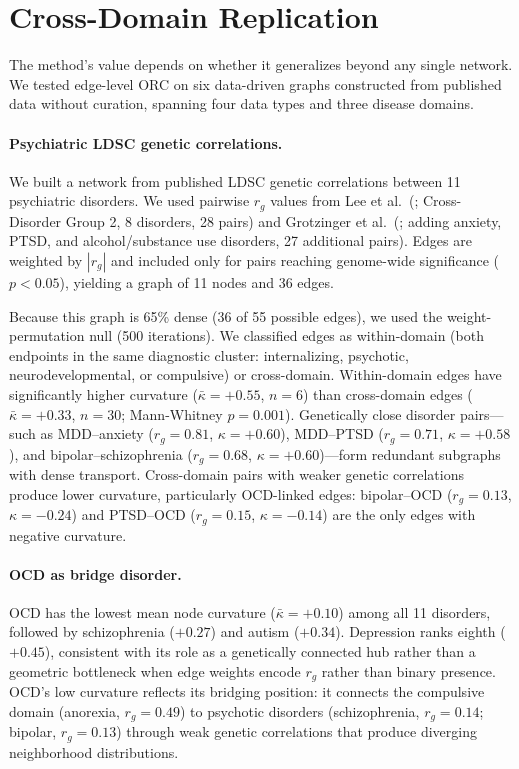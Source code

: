 \documentclass[11pt]{article}
\begin{document}
\section{Cross-Domain Replication}
\label{sec:replication}
\label{sec:ldsc}

The method's value depends on whether it generalizes beyond any single network. We tested edge-level ORC on six data-driven graphs constructed from published data without curation, spanning four data types and three disease domains.

\paragraph{Psychiatric LDSC genetic correlations.} We built a network from published LDSC genetic correlations \citep{buliksullivan2015ld} between 11 psychiatric disorders. We used pairwise $r_g$ values from Lee et al.\ (\citeyear{lee2022genetic}; Cross-Disorder Group 2, 8 disorders, 28 pairs) and Grotzinger et al.\ (\citeyear{grotzinger2022genetic}; adding anxiety, PTSD, and alcohol/substance use disorders, 27 additional pairs). Edges are weighted by $|r_g|$ and included only for pairs reaching genome-wide significance ($p < 0.05$), yielding a graph of 11 nodes and 36 edges.

Because this graph is 65\% dense (36 of 55 possible edges), we used the weight-permutation null (500 iterations). We classified edges as within-domain (both endpoints in the same diagnostic cluster: internalizing, psychotic, neurodevelopmental, or compulsive) or cross-domain. Within-domain edges have significantly higher curvature ($\bar{\kappa} = +0.55$, $n = 6$) than cross-domain edges ($\bar{\kappa} = +0.33$, $n = 30$; Mann-Whitney $p = 0.001$). Genetically close disorder pairs---such as MDD--anxiety ($r_g = 0.81$, $\kappa = +0.60$), MDD--PTSD ($r_g = 0.71$, $\kappa = +0.58$), and bipolar--schizophrenia ($r_g = 0.68$, $\kappa = +0.60$)---form redundant subgraphs with dense transport. Cross-domain pairs with weaker genetic correlations produce lower curvature, particularly OCD-linked edges: bipolar--OCD ($r_g = 0.13$, $\kappa = -0.24$) and PTSD--OCD ($r_g = 0.15$, $\kappa = -0.14$) are the only edges with negative curvature.

\paragraph{OCD as bridge disorder.} OCD has the lowest mean node curvature ($\bar{\kappa} = +0.10$) among all 11 disorders, followed by schizophrenia ($+0.27$) and autism ($+0.34$). Depression ranks eighth ($+0.45$), consistent with its role as a genetically connected hub rather than a geometric bottleneck when edge weights encode $r_g$ rather than binary presence. OCD's low curvature reflects its bridging position: it connects the compulsive domain (anorexia, $r_g = 0.49$) to psychotic disorders (schizophrenia, $r_g = 0.14$; bipolar, $r_g = 0.13$) through weak genetic correlations that produce diverging neighborhood distributions.
\end{document}
